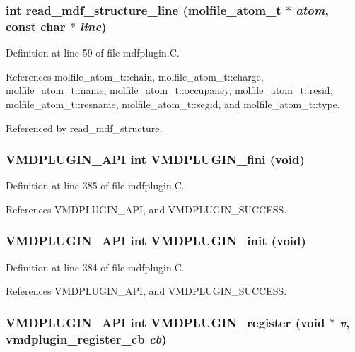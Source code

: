 \subsubsection{\setlength{\rightskip}{0pt plus 5cm}int read\_\-mdf\_\-structure\_\-line ({\bf molfile\_\-atom\_\-t} $\ast$ {\em atom}, const char $\ast$ {\em line})\hspace{0.3cm}{\tt  [static]}}\label{mdfplugin_8C_a4}




Definition at line 59 of file mdfplugin.C.

References molfile\_\-atom\_\-t::chain, molfile\_\-atom\_\-t::charge, molfile\_\-atom\_\-t::name, molfile\_\-atom\_\-t::occupancy, molfile\_\-atom\_\-t::resid, molfile\_\-atom\_\-t::resname, molfile\_\-atom\_\-t::segid, and molfile\_\-atom\_\-t::type.

Referenced by read\_\-mdf\_\-structure.
\subsubsection{\setlength{\rightskip}{0pt plus 5cm}VMDPLUGIN\_\-API int VMDPLUGIN\_\-fini (void)}\label{mdfplugin_8C_a12}




Definition at line 385 of file mdfplugin.C.

References VMDPLUGIN\_\-API, and VMDPLUGIN\_\-SUCCESS.
\subsubsection{\setlength{\rightskip}{0pt plus 5cm}VMDPLUGIN\_\-API int VMDPLUGIN\_\-init (void)}\label{mdfplugin_8C_a11}




Definition at line 384 of file mdfplugin.C.

References VMDPLUGIN\_\-API, and VMDPLUGIN\_\-SUCCESS.
\subsubsection{\setlength{\rightskip}{0pt plus 5cm}VMDPLUGIN\_\-API int VMDPLUGIN\_\-register (void $\ast$ {\em v}, {\bf vmdplugin\_\-register\_\-cb} {\em cb})}\label{mdfplugin_8C_a13}




